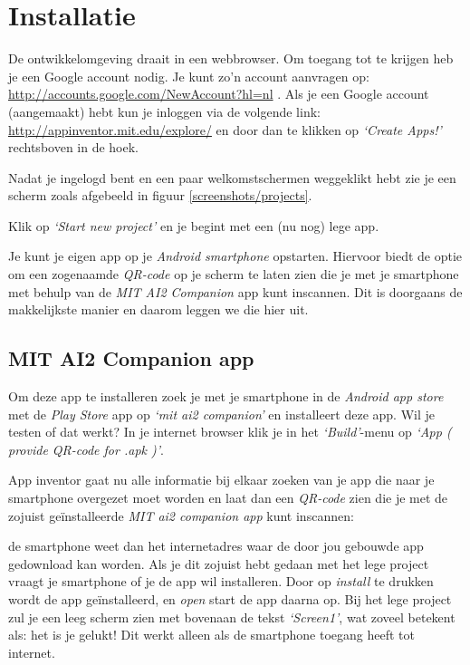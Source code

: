 \chapter{Installatie}

De \ai ontwikkelomgeving draait in een webbrowser. Om toegang tot \ai te krijgen heb je een Google account nodig. Je kunt zo'n account aanvragen op: \url{http://accounts.google.com/NewAccount?hl=nl} . Als je een Google account (aangemaakt) hebt kun je inloggen via de volgende link: \url{http://appinventor.mit.edu/explore/} en door dan te klikken op \emph{`Create Apps!'} rechtsboven in de hoek.


Nadat je ingelogd bent en een paar welkomstschermen weggeklikt hebt zie je een scherm zoals afgebeeld in figuur \ref{screenshots/projects}.


Klik op \emph{`Start new project'} en je begint met een (nu nog) lege app. 

Je kunt je eigen app op je \emph{Android smartphone} opstarten. Hiervoor biedt \ai de optie om een zogenaamde \emph{QR-code} op je scherm te laten zien die je met je smartphone met behulp van de \emph{MIT AI2 Companion} app kunt inscannen. Dit is doorgaans de makkelijkste manier en daarom leggen we die hier uit. 

\section{MIT AI2 Companion app}
Om deze app te installeren zoek je met je smartphone in de \emph{Android app store} met de \emph{Play Store} app op \emph{`mit ai2 companion'} en installeert deze app. Wil je testen of dat werkt? In je internet browser klik je in het \emph{`Build'}-menu op \emph{`App ( provide QR-code for .apk )'}.
 

App inventor gaat nu alle informatie bij elkaar zoeken van je app die naar je smartphone overgezet moet worden en laat dan een \emph{QR-code} zien die je met de zojuist ge\"installeerde \emph{MIT ai2 companion app} kunt inscannen: 


de smartphone weet dan het internetadres waar de door jou gebouwde app gedownload kan worden. Als je dit zojuist hebt gedaan met het lege project vraagt je smartphone of je de app wil installeren. Door op \emph{install} te drukken wordt de app ge\"installeerd, en \emph{open} start de app daarna op. Bij het lege project zul je een leeg scherm zien met bovenaan de tekst \emph{`Screen1'}, wat zoveel betekent als: het is je gelukt! Dit werkt alleen als de smartphone toegang heeft tot internet. 

